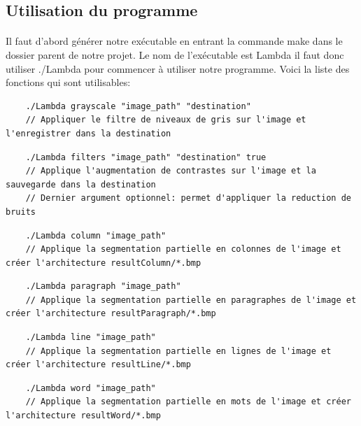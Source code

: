 \documentclass{article}
\begin{document}
\newpage
\subsection{Utilisation du programme}

\paragraph{}Il faut d'abord générer notre exécutable en entrant la commande make dans le dossier parent de notre projet. Le nom de l'exécutable est Lambda il faut donc utiliser ./Lambda pour commencer à utiliser notre programme. Voici la liste des fonctions qui sont utilisables:

\vspace*{0.5cm}

\begin{lstlisting}
	./Lambda grayscale "image_path" "destination"
	// Appliquer le filtre de niveaux de gris sur l'image et l'enregistrer dans la destination
\end{lstlisting}


\begin{lstlisting}
	./Lambda filters "image_path" "destination" true 
	// Applique l'augmentation de contrastes sur l'image et la sauvegarde dans la destination
	// Dernier argument optionnel: permet d'appliquer la reduction de bruits
\end{lstlisting}

\begin{lstlisting}
	./Lambda column "image_path"
	// Applique la segmentation partielle en colonnes de l'image et créer l'architecture resultColumn/*.bmp
\end{lstlisting}

\begin{lstlisting}
	./Lambda paragraph "image_path"
	// Applique la segmentation partielle en paragraphes de l'image et créer l'architecture resultParagraph/*.bmp
\end{lstlisting}

\begin{lstlisting}
	./Lambda line "image_path"
	// Applique la segmentation partielle en lignes de l'image et créer l'architecture resultLine/*.bmp
\end{lstlisting}

\begin{lstlisting}
	./Lambda word "image_path"
	// Applique la segmentation partielle en mots de l'image et créer l'architecture resultWord/*.bmp
\end{lstlisting}
\end{document}
